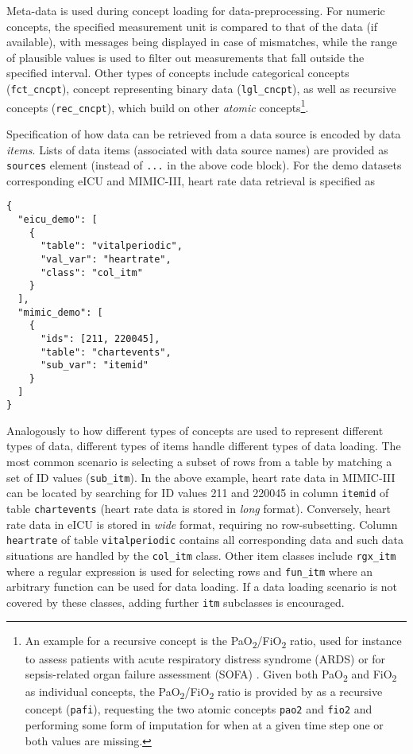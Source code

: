 \documentclass[
]{jss}
\begin{document}
Meta-data is used during concept loading for data-preprocessing. For
numeric concepts, the specified measurement unit is compared to that of
the data (if available), with messages being displayed in case of
mismatches, while the range of plausible values is used to filter out
measurements that fall outside the specified interval. Other types of
concepts include categorical concepts (\texttt{fct\_cncpt}), concept
representing binary data (\texttt{lgl\_cncpt}), as well as recursive
concepts (\texttt{rec\_cncpt}), which build on other \emph{atomic}
concepts\footnote{An example for a recursive concept is the
  PaO\textsubscript{2}/FiO\textsubscript{2} ratio, used for instance to
  assess patients with acute respiratory distress syndrome (ARDS) or for
  sepsis-related organ failure assessment (SOFA)
  \citep{villar2013, vincent1996}. Given both PaO\textsubscript{2} and
  FiO\textsubscript{2} as individual concepts, the
  PaO\textsubscript{2}/FiO\textsubscript{2} ratio is provided by
   as a recursive concept (\texttt{pafi}), requesting the two
  atomic concepts \texttt{pao2} and \texttt{fio2} and performing some
  form of imputation for when at a given time step one or both values
  are missing.}.

Specification of how data can be retrieved from a data source is encoded
by data \emph{items}. Lists of data items (associated with data source
names) are provided as \texttt{sources} element (instead of \texttt{...}
in the above code block). For the demo datasets corresponding eICU and
MIMIC-III, heart rate data retrieval is specified as

\begin{verbatim}
{
  "eicu_demo": [
    {
      "table": "vitalperiodic",
      "val_var": "heartrate",
      "class": "col_itm"
    }
  ],
  "mimic_demo": [
    {
      "ids": [211, 220045],
      "table": "chartevents",
      "sub_var": "itemid"
    }
  ]
}
\end{verbatim}

Analogously to how different types of concepts are used to represent
different types of data, different types of items handle different types
of data loading. The most common scenario is selecting a subset of rows
from a table by matching a set of ID values (\texttt{sub\_itm}). In the
above example, heart rate data in MIMIC-III can be located by searching
for ID values 211 and 220045 in column \texttt{itemid} of table
\texttt{chartevents} (heart rate data is stored in \emph{long} format).
Conversely, heart rate data in eICU is stored in \emph{wide} format,
requiring no row-subsetting. Column \texttt{heartrate} of table
\texttt{vitalperiodic} contains all corresponding data and such data
situations are handled by the \texttt{col\_itm} class. Other item
classes include \texttt{rgx\_itm} where a regular expression is used for
selecting rows and \texttt{fun\_itm} where an arbitrary function can be
used for data loading. If a data loading scenario is not covered by
these classes, adding further \texttt{itm} subclasses is encouraged.
\end{document}
